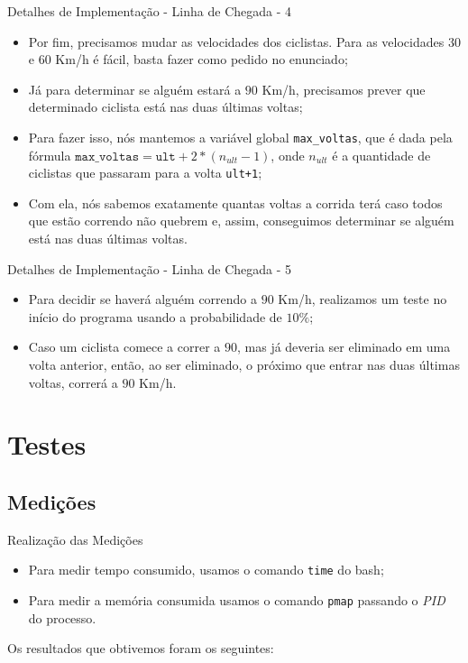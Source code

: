\documentclass[10pt]{beamer}
\begin{document}
  \begin{frame}{Detalhes de Implementação - Linha de Chegada - 4}
      \begin{itemize}
        \justifying
      \item Por fim, precisamos mudar as velocidades dos ciclistas. Para as
        velocidades $30$ e $60$ Km/h é fácil, basta fazer como pedido no
        enunciado;
      \item Já para determinar se alguém estará a $90$ Km/h, precisamos prever
        que determinado ciclista está nas duas últimas voltas;
      \item Para fazer isso, nós mantemos a variável global \texttt{max\_voltas},
        que é dada pela fórmula $\texttt{max\_voltas} = \texttt{ult} + 2 *
        (n_{ult}-1)$, onde $n_{ult}$ é a quantidade de ciclistas que passaram
        para a volta \texttt{ult+1};
      \item Com ela, nós sabemos exatamente quantas voltas a corrida terá caso
        todos que estão correndo não quebrem e, assim, conseguimos determinar se
        alguém está nas duas últimas voltas.
      \end{itemize}
    \end{frame}

    \begin{frame}{Detalhes de Implementação - Linha de Chegada - 5}
      \begin{itemize}
        \item Para decidir se haverá alguém correndo a $90$ Km/h, realizamos um
          teste no início do programa usando a probabilidade de $10\%$;
        \item Caso um ciclista comece a correr a $90$, mas já deveria ser
          eliminado em uma volta anterior, então, ao ser eliminado, o próximo
          que entrar nas duas últimas voltas, correrá a $90$ Km/h.
      \end{itemize}
    \end{frame}


    \section{Testes}
    \subsection{Medições}
    \begin{frame}{Realização das Medições}
      \begin{itemize}
        \item Para medir tempo consumido, usamos o comando \texttt{time} do
          bash;
        \item Para medir a memória consumida usamos o comando \texttt{pmap}
          passando o \textit{PID} do processo.
      \end{itemize}
      Os resultados que obtivemos foram os seguintes:
    \end{frame}
\end{document}
